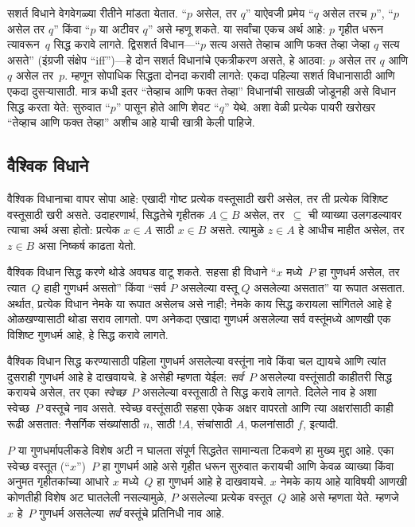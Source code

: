 \documentclass[../../../include/open-logic-section]{subfiles}
\begin{document}
सशर्त विधाने वेगवेगळ्या रीतीने मांडता येतात. “$p$ असेल, तर $q$” याऐवजी प्रमेय “$q$ असेल तरच $p$”, “$p$ असेल तर $q$” किंवा “$p$ या अटीवर $q$” असे म्हणू शकते. या सर्वांचा एकच अर्थ आहे: $p$ गृहीत धरून त्यावरून~$q$ सिद्ध करावे लागते. द्विसशर्त विधान---“$p$ सत्य असते तेव्हाच आणि फक्त तेव्हा जेव्हा $q$ सत्य असते” (इंग्रजी संक्षेप “iff”)---हे दोन सशर्त विधानांचे एकत्रीकरण असते, हे आठवा: $p$ असेल तर $q$ आणि $q$ असेल तर~$p$. म्हणून सोपाधिक सिद्धता दोनदा करावी लागते: एकदा पहिल्या सशर्त विधानासाठी आणि एकदा दुसऱ्यासाठी. मात्र कधी इतर “तेव्हाच आणि फक्त तेव्हा” विधानांची साखळी जोडूनही असे विधान सिद्ध करता येते: सुरुवात “$p$” पासून होते आणि शेवट “$q$” येथे. अशा वेळी प्रत्येक पायरी खरोखर “तेव्हाच आणि फक्त तेव्हा” अशीच आहे याची खात्री केली पाहिजे.

\subsection{वैश्विक विधाने}

वैश्विक विधानाचा वापर सोपा आहे: एखादी गोष्ट प्रत्येक वस्तूसाठी खरी असेल, तर ती प्रत्येक विशिष्ट वस्तूसाठी खरी असते. उदाहरणार्थ, सिद्धतेचे गृहीतक $A \subseteq B$ असेल, तर~$\subseteq$ ची व्याख्या उलगडल्यावर त्याचा अर्थ असा होतो: प्रत्येक $x \in A$ साठी $x \in B$ असते. त्यामुळे $z \in A$ हे आधीच माहीत असेल, तर $z \in B$ असा निष्कर्ष काढता येतो.

वैश्विक विधान सिद्ध करणे थोडे अवघड वाटू शकते. सहसा ही विधाने “$x$ मध्ये~$P$ हा गुणधर्म असेल, तर त्यात~$Q$ हाही गुणधर्म असतो” किंवा “सर्व $P$ असलेल्या वस्तू $Q$ असलेल्या असतात” या रूपात असतात. अर्थात, प्रत्येक विधान नेमके या रूपात असेलच असे नाही; नेमके काय सिद्ध करायला सांगितले आहे हे ओळखण्यासाठी थोडा सराव लागतो. पण अनेकदा एखादा गुणधर्म असलेल्या सर्व वस्तूंमध्ये आणखी एक विशिष्ट गुणधर्म आहे, हे सिद्ध करावे लागते.

वैश्विक विधान सिद्ध करण्यासाठी पहिला गुणधर्म असलेल्या वस्तूंना नावे किंवा चल द्यायचे आणि त्यांत दुसराही गुणधर्म आहे हे दाखवायचे. हे असेही म्हणता येईल: \emph{सर्व}~$P$ असलेल्या वस्तूंसाठी काहीतरी सिद्ध करायचे असेल, तर एका \emph{स्वेच्छ}~$P$ असलेल्या वस्तूसाठी ते सिद्ध करावे लागते. दिलेले नाव हे अशा स्वेच्छ~$P$ वस्तूचे नाव असते. स्वेच्छ वस्तूंसाठी सहसा एकेक अक्षर वापरतो आणि त्या अक्षरांसाठी काही रूढी असतात: नैसर्गिक संख्यांसाठी $n$, साठी $!A$, संचांसाठी $A$, फलनांसाठी $f$, इत्यादी.

$P$ या गुणधर्मापलीकडे विशेष अटी न घालता संपूर्ण सिद्धतेत सामान्यता टिकवणे हा मुख्य मुद्दा आहे. एका स्वेच्छ वस्तूत (“$x$”)~$P$ हा गुणधर्म आहे असे गृहीत धरून सुरुवात करायची आणि केवळ व्याख्या किंवा अनुमत गृहीतकांच्या आधारे $x$ मध्ये~$Q$ हा गुणधर्म आहे हे दाखवायचे. $x$ नेमके काय आहे याविषयी आणखी कोणतीही विशेष अट घातलेली नसल्यामुळे, $P$ असलेल्या प्रत्येक वस्तूत~$Q$ आहे असे म्हणता येते. म्हणजे $x$ हे~$P$ गुणधर्म असलेल्या \emph{सर्व} वस्तूंचे प्रतिनिधी नाव आहे.
\end{document}

